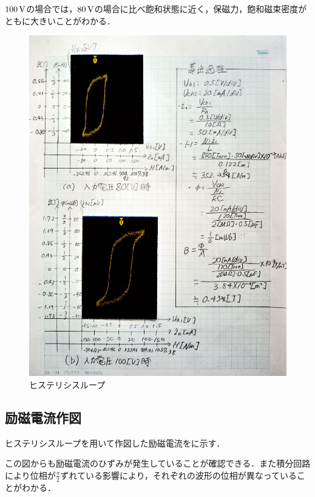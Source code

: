 $100\,\rm{V}$の場合では，$80\,\rm{V}$の場合に比べ飽和状態に近く，保磁力，飽和磁束密度がともに大きいことがわかる．
\begin{figure}[h]
	\centering
	\includegraphics[scale=0.8]{./data/graph/2.pdf}
	\caption{ヒステリシスループ}
	\label{fig:2}
\end{figure}

\subsection{励磁電流作図}
ヒステリシスループを用いて作図した励磁電流をに示す．

この図からも励磁電流のひずみが発生していることが確認できる．また積分回路により位相が$\frac{\pi}{2}$ずれている影響により，それぞれの波形の位相が異なっていることがわかる．

